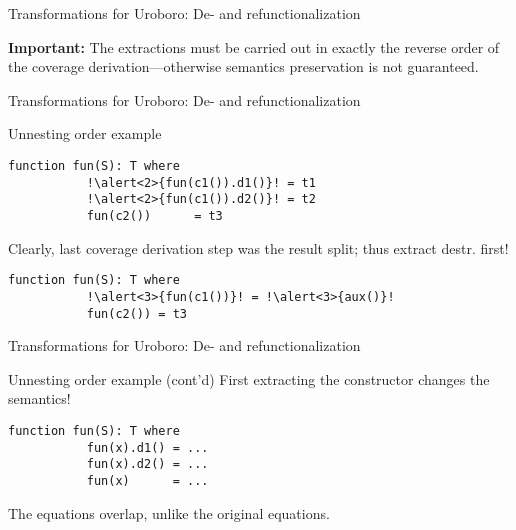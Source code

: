 \documentclass[xcolor=svgnames]{beamer}
\begin{document}
\begin{frame}
  {Transformations for Uroboro: De- and refunctionalization}

\textbf{Important:} The extractions must be carried out in exactly the reverse order of the coverage derivation---otherwise semantics preservation is not guaranteed.

\end{frame}

\begin{frame}[fragile]
  {Transformations for Uroboro: De- and refunctionalization}

  \begin{block}{Unnesting order example}
    \begin{block}{}
      \begin{lstlisting}[escapechar=!]
         function fun(S): T where
           !\alert<2>{fun(c1()).d1()}! = t1
           !\alert<2>{fun(c1()).d2()}! = t2
           fun(c2())      = t3
      \end{lstlisting}
    \end{block}
    Clearly, last coverage derivation step was the result split; thus extract destr. first!
    \begin{block}{}
      \begin{lstlisting}[escapechar=!]
         function fun(S): T where
           !\alert<3>{fun(c1())}! = !\alert<3>{aux()}!
           fun(c2()) = t3
      \end{lstlisting}
    \end{block}
  \end{block}
\end{frame}

\begin{frame}[fragile]
  {Transformations for Uroboro: De- and refunctionalization}

  \begin{block}{Unnesting order example (cont'd)}
    First extracting the constructor changes the semantics!
    \begin{block}{}
      \begin{lstlisting}[escapechar=!]
         function fun(S): T where
           fun(x).d1() = ...
           fun(x).d2() = ...
           fun(x)      = ...
      \end{lstlisting}
    \end{block}
    The equations overlap, unlike the original equations.
  \end{block}
\end{frame}
\end{document}
